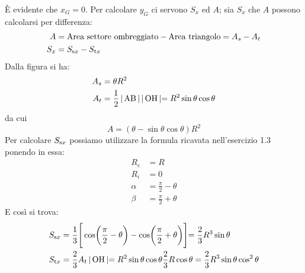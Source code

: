 \noindent È evidente che $x_G=0$. Per calcolare $y_G$ ci servono $S_x$ ed $A$; sia $S_x$ che $A$ possono calcolarsi per differenza: 
\begin{align*}
A &= \textup{Area settore ombreggiato} - \textup{Area triangolo} = A_s - A_t \\
S_x &= S_{\textup{s}x} - S_{\textup{t}x}
\end{align*}
Dalla figura si ha: 
\begin{align*}
A_s &= \theta R^2 \\ 
A_t &= \frac{1}{2}\, \lvert \, \textup{AB} \, \lvert \, \lvert \, \textup{OH} \, \lvert = R^2 \sin\theta\cos\theta
\end{align*}
da cui 
\begin{equation*}
A = (\theta-\sin\theta\cos\theta)R^2
\end{equation*}
Per calcolare $S_{\textup{s}x}$ possiamo utilizzare la formula ricavata nell'esercizio 1.3 ponendo in essa:
\begin{align*}
R_e &= R \\
R_i &= 0 \\
\alpha &= \frac{\pi}{2}-\theta \\ 
\beta &= \frac{\pi}{2}+\theta
\end{align*}
E così si trova:
\begin{align*}
S_{\textup{s}x} &= \frac{1}{3}\Biggr[\cos\biggl(\frac{\pi}{2}-\theta\biggr)-\cos\biggl(\frac{\pi}{2}+\theta\biggr)\Biggl]=\frac{2}{3}R^3 \sin\theta \\
S_{\textup{t}x} &= \frac{2}{3}A_t\, \lvert \, \textup{OH} \, \lvert =R^2 \sin\theta\cos\theta\frac{2}{3}R\cos\theta =\frac{2}{3}R^3 \sin\theta\cos^{2}\theta
\end{align*}

